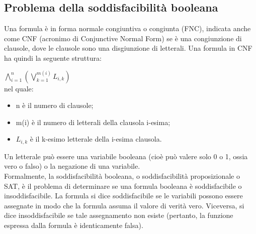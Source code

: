 \documentclass[a4paper,11pt]{article} %
\begin{document}
\subsection{Problema della soddisfacibilità booleana}
Una formula è in forma normale congiuntiva o congiunta (FNC), indicata anche come CNF (acronimo di Conjunctive Normal Form) se è una congiunzione di clausole, dove le clausole sono una disgiunzione di letterali. Una formula in CNF ha quindi la seguente struttura:

${\displaystyle \bigwedge _{i=1}^{n}\left(\bigvee _{k=1}^{m(i)}L_{i,k}\right)}$ \\

nel quale:
\begin{itemize}
	\item n è il numero di clausole;
	\item m(i) è il numero di letterali della clausola i-esima;
	\item $L_{i,k}$ è il k-esimo letterale della i-esima clausola.
\end{itemize}
Un letterale può essere una variabile booleana (cioè può valere solo 0 o 1, ossia vero o falso) o la negazione di una variabile.\\
Formalmente, la soddisfacibilità booleana, o soddisfacibilità proposizionale o SAT, è il problema di determinare se una formula booleana è soddisfacibile o insoddisfacibile. La formula si dice soddisfacibile se le variabili possono essere assegnate in modo che la formula assuma il valore di verità vero. Viceversa, si dice insoddisfacibile se tale assegnamento non esiste (pertanto, la funzione espressa dalla formula è identicamente falsa).
\end{document}
